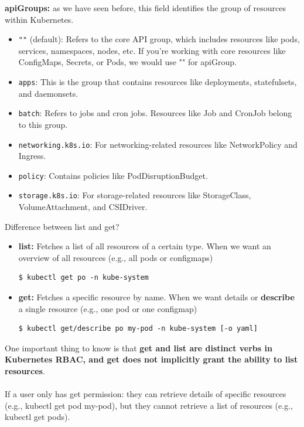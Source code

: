 \documentclass{article}
\newenvironment{blocktemplate}[1]{%
    \tcolorbox[beamer,%
    noparskip,breakable,
    colframe=Blue,%
    colbacklower=LimeGreen!75!LightGreen,%
    title=#1]}%
    {\endtcolorbox}
\newenvironment{codetemplate}[1][]{%
  \mybasecolorbox[#1]
  \itshape
}{%
  \endmybasecolorbox
}
\begin{document}
\textbf{apiGroups:} as we have seen before, this field identifies the group of resources within Kubernetes.
\begin{itemize}
    \item \verb|""| (default): Refers to the core API group, which includes resources like pods, services, namespaces, nodes, etc. If you're working with core resources like ConfigMaps, Secrets, or Pods, we would use "" for apiGroup.
    \item \verb|apps|: This is the group that contains resources like deployments, statefulsets, and daemonsets.
    \item \verb|batch|: Refers to jobs and cron jobs. Resources like Job and CronJob belong to this group.
    \item \verb|networking.k8s.io|: For networking-related resources like NetworkPolicy and Ingress.
    \item \verb|policy|: Contains policies like PodDisruptionBudget.
    \item \verb|storage.k8s.io|: For storage-related resources like StorageClass, VolumeAttachment, and CSIDriver.
\end{itemize}

\begin{blocktemplate}{NOTE}
Difference between list and get?
\begin{itemize}
    \item \textbf{list:} Fetches a list of all resources of a certain type. When we want an overview of all resources (e.g., all pods or configmaps)
\begin{codetemplate}{}
\begin{verbatim}
$ kubectl get po -n kube-system
\end{verbatim}
\end{codetemplate}
    \item \textbf{get:} Fetches a specific resource by name. When we want details or \textbf{describe} a single resource (e.g., one pod or one configmap)
\begin{codetemplate}{}
\begin{verbatim}
$ kubectl get/describe po my-pod -n kube-system [-o yaml]
\end{verbatim}
\end{codetemplate}
\end{itemize}

One important thing to know is that \textbf{get and list are distinct verbs in Kubernetes RBAC, and get does not implicitly grant the ability to list resources}.
\\\\
If a user only has get permission: they can retrieve details of specific resources (e.g., kubectl get pod my-pod), but they cannot retrieve a list of resources (e.g., kubectl get pods).
\end{blocktemplate}
\end{document}
